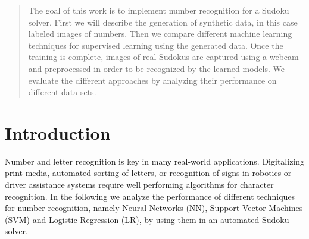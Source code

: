 \documentclass{article}
\begin{document}
 


\begin{abstract}
The goal of this work is to implement number recognition for a Sudoku solver.
First we will describe the generation of synthetic data, in this case labeled images of numbers.
Then we compare different machine learning techniques for supervised learning using the generated data.
Once the training is complete, images of real Sudokus are captured using a webcam and preprocessed in order to be recognized by the learned models. We evaluate the different approaches by analyzing their performance on different data sets.
\end{abstract}

\section{Introduction}
Number and letter recognition is key in many real-world applications. Digitalizing print media, automated sorting of letters, or recognition of signs in robotics or driver assistance systems require well performing algorithms for character recognition. In the following we analyze the performance of different techniques for number recognition, namely Neural Networks (NN), Support Vector Machines (SVM) and Logistic Regression (LR), by using them in an automated Sudoku solver.
\end{document}
